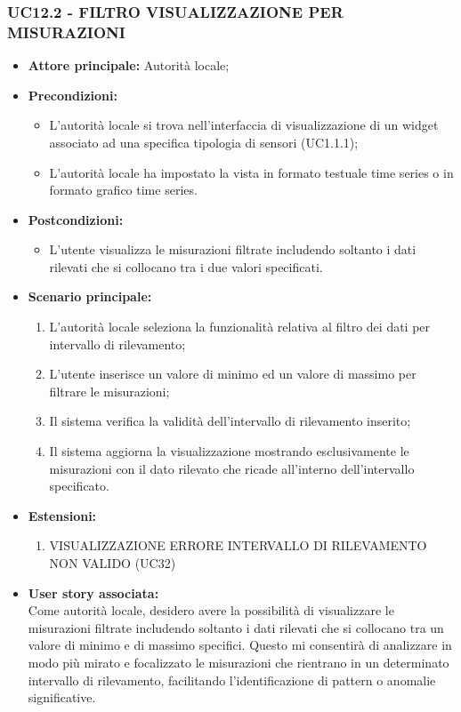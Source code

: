 \subsubsection{UC12.2 - FILTRO VISUALIZZAZIONE PER MISURAZIONI}
\begin{itemize}
    \item \textbf{Attore principale:} Autorità locale;
    \item \textbf{Precondizioni:}
        \begin{itemize}
            \item L'autorità locale si trova nell'interfaccia di visualizzazione di un widget associato ad una specifica tipologia di sensori (UC1.1.1);
            \item L'autorità locale ha impostato la vista in formato testuale time series o in formato grafico time series.
        \end{itemize}
    \item \textbf{Postcondizioni:}
        \begin{itemize}
            \item L'utente visualizza le misurazioni filtrate includendo soltanto i dati rilevati che si collocano tra i due valori specificati.
        \end{itemize}
    \item \textbf{Scenario principale:}
        \begin{enumerate}
            \item L'autorità locale seleziona la funzionalità relativa al filtro dei dati per intervallo di rilevamento;
            \item L'utente inserisce un valore di minimo ed un valore di massimo per filtrare le misurazioni;
            \item Il sistema verifica la validità dell'intervallo di rilevamento inserito;
            \item Il sistema aggiorna la visualizzazione mostrando esclusivamente le misurazioni con il dato rilevato che ricade all'interno dell'intervallo specificato.
        \end{enumerate}
    \vspace{0,5cm}
    \item \textbf{Estensioni:}
        \begin{enumerate}
            \item VISUALIZZAZIONE ERRORE INTERVALLO DI RILEVAMENTO NON VALIDO (UC32)
        \end{enumerate}
    \item \textbf{User story associata:} \\
        Come autorità locale, desidero avere la possibilità di visualizzare le misurazioni filtrate includendo soltanto i dati rilevati che si collocano tra un valore di minimo e di massimo specifici. Questo mi consentirà di analizzare in modo più mirato e focalizzato le misurazioni che rientrano in un determinato intervallo di rilevamento, facilitando l'identificazione di pattern o anomalie significative.
\end{itemize}
